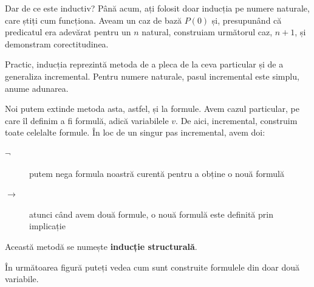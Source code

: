 Dar de ce este inductiv? Până acum, ați folosit doar inducția pe numere naturale, care știți cum funcționa. Aveam un caz de bază \( P(0) \) și, presupunând că
predicatul era adevărat pentru un \( n \) natural, construiam următorul caz, \( n + 1 \), și demonstram corectitudinea.

Practic, inducția reprezintă metoda de a pleca de la ceva particular și de a generaliza incremental. Pentru numere naturale, pasul incremental este simplu, anume adunarea.

Noi putem extinde metoda asta, astfel, și la formule. Avem cazul particular, pe care îl definim a fi formulă, adică variabilele \( v \). De aici, incremental, construim
toate celelalte formule. În loc de un singur pas incremental, avem doi:

\begin{description}
	\item[\( \neg \)] putem nega formula noastră curentă pentru a obține o nouă formulă
	\item[\( \to \)] atunci când avem două formule, o nouă formulă este definită prin implicație
\end{description}

Această metodă se numește \textbf{inducție structurală}.

\noindent În următoarea figură puteți vedea cum sunt construite formulele din doar două variabile.


